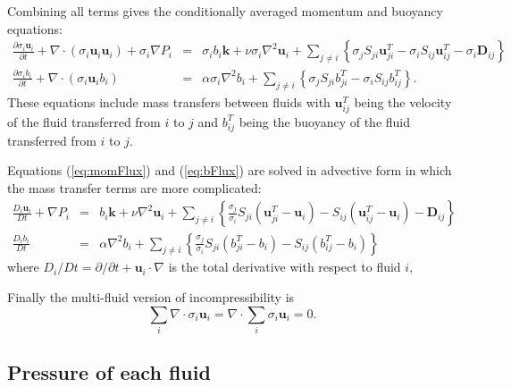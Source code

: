 \documentclass[draft]{agujournal2019}
\begin{document}
Combining all terms gives the conditionally averaged momentum and buoyancy equations:
\begin{eqnarray}
\frac{\partial\sigma_i\mathbf{u}_{i}}{\partial t} + 
\nabla\cdot(\sigma_i \mathbf{u}_{i} \mathbf{u}_{i})
+ \sigma_i \nabla P_{i}
& = &
\sigma_i b_{i}\mathbf{k}
+
\nu\sigma_i\nabla^{2}\mathbf{u}_{i}
+
\sum_{j\ne i}\left\{
     \sigma_{j} S_{ji}\mathbf{u}_{ji}^{T}
   - \sigma_{i} S_{ij}\mathbf{u}_{ij}^{T}
   - \sigma_{i}\mathbf{D}_{ij}\right\}
\label{eq:momFlux}\\
\frac{\partial\sigma_i b_{i}}{\partial t} + 
\nabla\cdot(\sigma_i \mathbf{u}_{i} b_{i})
& = &
\alpha\sigma_i\nabla^{2}b_{i}
+
\sum_{j\ne i}\left\{
    \sigma_{j} S_{ji} b_{ji}^{T}
  - \sigma_{i} S_{ij} b_{ij}^{T}
\right\}.
\label{eq:bFlux}
\end{eqnarray}
These equations include mass transfers between fluids with $\mathbf{u}_{ij}^T$ being the velocity of the fluid transferred from $i$ to $j$ and $b_{ij}^T$ being the buoyancy of the fluid transferred from $i$ to $j$. 

Equations (\ref{eq:momFlux}) and (\ref{eq:bFlux}) are solved in advective form in which the mass transfer terms are more complicated: 
\begin{eqnarray}
\frac{D_{i}\mathbf{u}_{i}}{Dt}+\nabla P_{i}
& = &
b_{i}\mathbf{k}+\nu\nabla^{2}\mathbf{u}_{i}+\sum_{j\ne i}\left\{ \frac{\sigma_{j}}{\sigma_{i}}S_{ji}\left(\mathbf{u}_{ji}^{T}-\mathbf{u}_{i}\right)-S_{ij}(\mathbf{u}_{ij}^{T}-\mathbf{u}_{i})-\mathbf{D}_{ij}\right\}
\label{eq:mom}\\
\frac{D_{i}b_{i}}{Dt}
& = &
\alpha\nabla^{2}b_{i}+\sum_{j\ne i}\left\{ \frac{\sigma_{j}}{\sigma_{i}}S_{ji}\left(b_{ji}^{T}-b_{i}\right)-S_{ij}\left(b_{ij}^{T}-b_{i}\right)\right\} \label{eq:b}
\end{eqnarray}
where $D_{i}\big/Dt=\partial/\partial t+\mathbf{u}_{i}\cdot\nabla$ is the total derivative with respect to fluid $i$, 

Finally the multi-fluid version of incompressibility is
\begin{equation}
\sum_{i}\nabla\cdot\sigma_{i}\mathbf{u}_{i}  = \nabla\cdot\sum_{i}\sigma_{i}\mathbf{u}_{i}=0.
\label{eq:divFree}
\end{equation}

\subsection{Pressure of each fluid \label{subsec:fluidPressure}}
\end{document}
